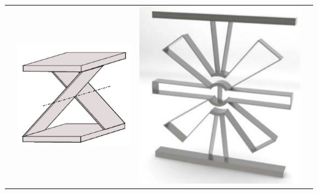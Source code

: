 \begin{table}[h]
\begin{tabular}{p{4cm}|p{4cm}p{4cm}p{4cm}}
\begin{minipage}{4cm}
    \end{minipage} 
    &     
    \begin{minipage}{4cm}
      \includegraphics[width=\linewidth]{images/Cross_Flexure.JPG}
    \end{minipage} 
    &     
    \begin{minipage}{4cm}
      \includegraphics[width=\linewidth]{images/Flex16.JPG}

\end{minipage}
\end{tabular}
\end{table}

